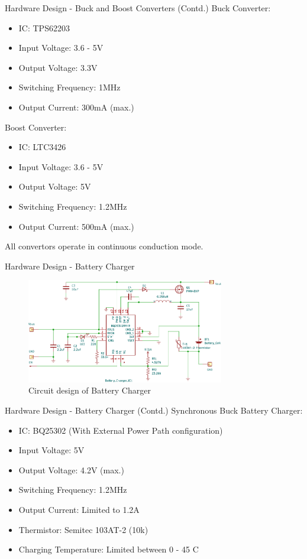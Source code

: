 \documentclass[aspectratio=169]{beamer}
\begin{document}
\begin{frame}{Hardware Design - Buck and Boost Converters (Contd.)}
	Buck Converter:
	\begin{itemize}
		\item IC: TPS62203
		\item Input Voltage: 3.6 - 5V
		\item Output Voltage: 3.3V
		\item Switching Frequency: 1MHz
		\item Output Current: 300mA (max.)
		\end{itemize}
		Boost Converter:
			\begin{itemize}
			\item IC: LTC3426
			\item Input Voltage: 3.6 - 5V
			\item Output Voltage: 5V
			\item Switching Frequency: 1.2MHz
			\item Output Current: 500mA (max.)
		\end{itemize}
	All convertors operate in continuous conduction mode.
	\end{frame}

		\begin{frame}{Hardware Design - Battery Charger }
	\begin{figure}[h]
		\centering
		\includegraphics[width=0.77\textwidth]{diag/charg2.pdf}
		\caption{Circuit design of Battery Charger}
		\label{fig:mesh1}
	\end{figure}
\end{frame}


\begin{frame}{Hardware Design - Battery Charger (Contd.)}
	Synchronous Buck Battery Charger:
	\begin{itemize}
		\item IC: BQ25302 (With External Power Path configuration)
		\item Input Voltage: 5V
		\item Output Voltage: 4.2V (max.)
		\item Switching Frequency: 1.2MHz
		\item Output Current: Limited to 1.2A
		\item Thermistor: Semitec 103AT-2 (10k\ohm)
		\item Charging Temperature: Limited between 0 - 45 C
				\end{itemize}
	\end{frame}
\end{document}
